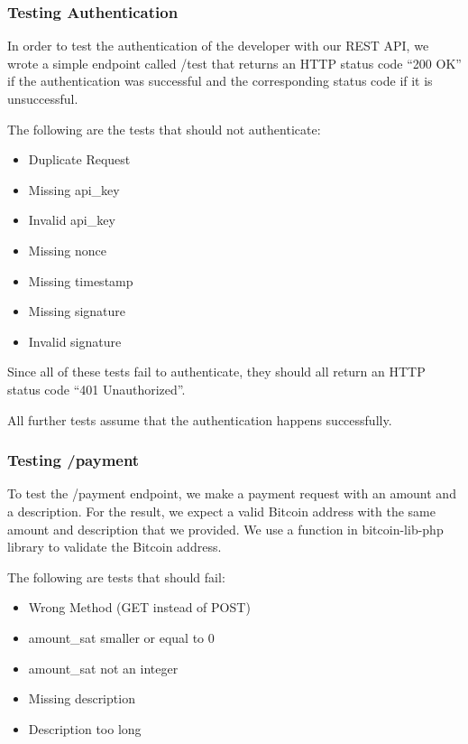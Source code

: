 \subsubsection{Testing Authentication}
In order to test the authentication of the developer with our REST API, we wrote a simple endpoint called /test that returns an HTTP status code ``200 OK'' if the authentication was successful and the corresponding status code if it is unsuccessful.



The following are the tests that should not authenticate:

\begin{itemize}
	\item Duplicate Request
	\item Missing api\_key
	\item Invalid api\_key
	\item Missing nonce
	\item Missing timestamp
	\item Missing signature
	\item Invalid signature
\end{itemize}

Since all of these tests fail to authenticate, they should all return an HTTP status code ``401 Unauthorized''.

All further tests assume that the authentication happens successfully.

\subsubsection{Testing /payment}

To test the /payment endpoint, we make a payment request with an amount and a description. For the result, we expect a valid Bitcoin address with the same amount and description that we provided. We use a function in bitcoin-lib-php library to validate the Bitcoin address. 

The following are tests that should fail:

\begin{itemize}
	\item Wrong Method (GET instead of POST)
	\item amount\_sat smaller or equal to 0
	\item amount\_sat not an integer
	\item Missing description
	\item Description too long
\end{itemize}

